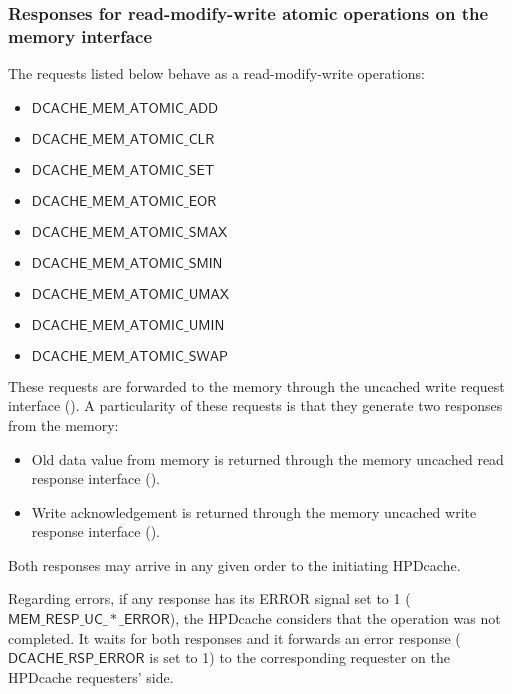 \documentclass[10pt,titlepage,twoside]{book}
\begin{document}
\subsubsection{Responses for read-modify-write atomic operations on the memory interface}

\begin{minipage}{\textwidth}
The requests listed below behave as a read-modify-write operations:
{\small\begin{itemize}[itemsep=0pt]
  \item $\mathsf{DCACHE\_MEM\_ATOMIC\_ADD}$
  \item $\mathsf{DCACHE\_MEM\_ATOMIC\_CLR}$
  \item $\mathsf{DCACHE\_MEM\_ATOMIC\_SET}$
  \item $\mathsf{DCACHE\_MEM\_ATOMIC\_EOR}$
  \item $\mathsf{DCACHE\_MEM\_ATOMIC\_SMAX}$
  \item $\mathsf{DCACHE\_MEM\_ATOMIC\_SMIN}$
  \item $\mathsf{DCACHE\_MEM\_ATOMIC\_UMAX}$
  \item $\mathsf{DCACHE\_MEM\_ATOMIC\_UMIN}$
  \item $\mathsf{DCACHE\_MEM\_ATOMIC\_SWAP}$
\end{itemize}}
\end{minipage}

These requests are forwarded to the memory through the uncached write request interface ().
A particularity of these requests is that they generate two responses from the memory:
\begin{itemize}
  \item Old data value from memory is returned through the memory uncached read response interface ().
  \item Write acknowledgement is returned through the memory uncached write response interface ().
\end{itemize}

Both responses may arrive in any given order to the initiating \ac{HPDcache}.

Regarding errors, if any response has its ERROR signal set to 1 ($\mathsf{MEM\_RESP\_UC\_*\_ERROR}$), the \ac{HPDcache} considers that the operation was not completed.
It waits for both responses and it forwards an error response ($\mathsf{DCACHE\_RSP\_ERROR}$ is set to 1) to the corresponding requester on the \ac{HPDcache} requesters' side.
\end{document}

